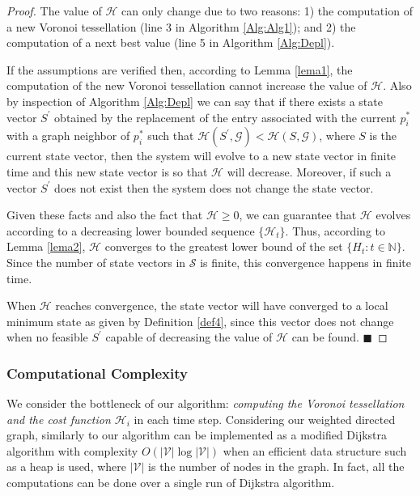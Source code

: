 \documentclass[smallcondensed]{svjour3}
\newcommand*{\QEDA}{\hfill\ensuremath{\blacksquare}}%
\begin{document}
\begin{proof}
%
The value of $\mathcal H$ can only change due to two reasons: 1) the computation of a new Voronoi tessellation (line 3 in Algorithm \ref{Alg:Alg1}); and 2) the computation of a next best value (line 5 in Algorithm \ref{Alg:Depl}).

If the assumptions are verified then, according to Lemma \ref{lema1}, the computation of the new Voronoi tessellation cannot increase the value of $\mathcal H$. Also by inspection of Algorithm \ref{Alg:Depl} we can say that if there exists a state vector $S^\prime$ obtained by the replacement of the entry associated with the current $p_i ^*$ with a graph neighbor of $p_i^*$ such that $\mathcal H(S^\prime , \mathcal G) < \mathcal H(S,\mathcal G)$, where $S$ is the current state vector, then the system will evolve to a new state vector in finite time and this new state vector is so that $\mathcal H$ will decrease. Moreover, if such a vector $S^\prime$ does not exist then the system does not change the state vector.

Given these facts and also the fact that $\mathcal H \geq 0 $, we can guarantee that $\mathcal H$ evolves according to a decreasing lower bounded sequence $\{\mathcal H_t\}$. Thus, according to Lemma \ref{lema2}, $\mathcal H$ converges to the greatest lower bound of the set $\{H_t: t \in \mathbb N \}$. Since the number of state vectors in $\mathcal{S}$ is finite, this convergence happens in finite time.

When $\mathcal H$ reaches convergence, the state vector will have converged to a local minimum state as given by Definition \ref{def4}, since this vector does not change when no feasible $S^\prime$ capable of decreasing the value of $\mathcal H$ can be found.
\QEDA
\end{proof}
%

\subsubsection{Computational Complexity}

We consider the bottleneck of our algorithm: \textit{computing the Voronoi tessellation and the cost function $\mathcal H_i$} in each time step. Considering our weighted directed graph, similarly to \citep{Bhattacharya2013IJRR} our algorithm can be implemented as a modified Dijkstra algorithm with complexity $O(|\mathcal{V}| \log |\mathcal{V}|)$ when an efficient data structure such as a heap is used, where $|\mathcal{V}|$ is the number of nodes in the graph. In fact, all the computations can be done over a single run of Dijkstra algorithm.
\end{document}
